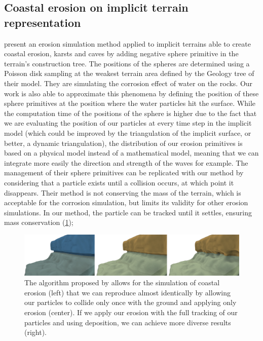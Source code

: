 \subsection{Coastal erosion on implicit terrain representation}
\citep{Paris2019b} present an erosion simulation method applied to implicit terrains able to create coastal erosion, karsts and caves by adding negative sphere primitive in the terrain's construction tree. The positions of the spheres are determined using a Poisson disk sampling at the weakest terrain area defined by the Geology tree of their model. They are simulating the corrosion effect of water on the rocks. Our work is also able to approximate this phenomena by defining the position of these sphere primitives at the position where the water particles hit the surface. While the computation time of the positions of the sphere is higher due to the fact that we are evaluating the position of our particles at every time step in the implicit model (which could be improved by the triangulation of the implicit surface, or better, a dynamic triangulation), the distribution of our erosion primitives is based on a physical model instead of a mathematical model, meaning that we can integrate more easily the direction and strength of the waves for example. The management of their sphere primitives can be replicated with our method by considering that a particle exists until a collision occurs, at which point it disappears. Their method is not conserving the mass of the terrain, which is acceptable for the corrosion simulation, but limits its validity for other erosion simulations. In our method, the particle can be tracked until it settles, ensuring mass conservation (\cref{fig:erosion_screen-paris2019-1});

\begin{figure}
\centering
\includegraphics{costal.pdf}
\caption{The algorithm proposed by \cite{Paris2019b} allows for the simulation of coastal erosion (left) that we can reproduce almost identically by allowing our particles to collide only once with the ground and applying only erosion (center). If we apply our erosion with the full tracking of our particles and using deposition, we can achieve more diverse results (right).}
\label{fig:erosion_screen-paris2019-1}
\end{figure}

